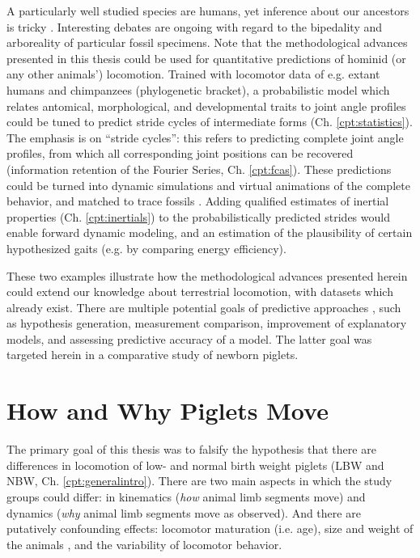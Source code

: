 A particularly well studied species are humans, yet inference about our ancestors is tricky \citep{Polk2004,Cazenave2023,Stamos2023}.
Interesting debates are ongoing with regard to the bipedality and arboreality of particular fossil specimens.
Note that the methodological advances presented in this thesis could be used for quantitative predictions of hominid (or any other animals') locomotion.
Trained with locomotor data of e.g. extant humans and chimpanzees (phylogenetic bracket), a probabilistic model which relates antomical, morphological, and developmental traits to joint angle profiles could be tuned to predict stride cycles of intermediate forms (Ch. \ref{cpt:statistics}).
The emphasis is on ``stride cycles'': this refers to predicting complete joint angle profiles, from which all corresponding joint positions can be recovered (information retention of the Fourier Series, Ch. \ref{cpt:fcas}).
These predictions could be turned into dynamic simulations and virtual animations of the complete behavior, and matched to trace fossils \citep[as in][but with less manual work]{Nyakatura2019}.
Adding qualified estimates of inertial properties (Ch. \ref{cpt:inertials}) to the probabilistically predicted strides would enable forward dynamic modeling, and an estimation of the plausibility of certain hypothesized gaits (e.g. by comparing energy efficiency).

\bigskip
These two examples illustrate how the methodological advances presented herein could extend our knowledge about terrestrial locomotion, with datasets which already exist.
There are multiple potential goals of predictive approaches \citep{Shmueli2010}, such as hypothesis generation, measurement comparison, improvement of explanatory models, and assessing predictive accuracy of a model.
The latter goal was targeted herein in a comparative study of newborn piglets.


\section{How and Why Piglets Move}
\label{sec:orgfb591a9}
The primary goal of this thesis was to falsify the hypothesis that there are differences in locomotion of low- and normal birth weight piglets (LBW and NBW, Ch. \ref{cpt:generalintro}).
There are two main aspects in which the study groups could differ: in kinematics (\emph{how} animal limb segments move) and dynamics (\emph{why} animal limb segments move as observed).
And there are putatively confounding effects: locomotor maturation (i.e. age), size and weight of the animals \citep[i.e. physical appearance, cf.][]{Aerts2023}, and the variability of locomotor behavior.


